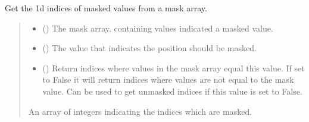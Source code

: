 \documentclass[letterpaper,10pt,english]{sphinxmanual}
\begin{document}
\begin{fulllineitems}
\label{\detokenize{misc:glomar_gridding.mask.get_mask_idx}}
\pysigstartsignatures
\pysiglinewithargsret
{}
{\sphinxparamcomma {}\sphinxparamcomma {}}
{}
\pysigstopsignatures
\sphinxAtStartPar
Get the 1d indices of masked values from a mask array.
\begin{quote}\begin{description}
\begin{itemize}
\item {}
\sphinxAtStartPar
{} () \textendash{} The mask array, containing values indicated a masked value.

\item {}
\sphinxAtStartPar
{} () \textendash{} The value that indicates the position should be masked.

\item {}
\sphinxAtStartPar
{} () \textendash{} Return indices where values in the mask array equal this value. If set
to False it will return indices where values are not equal to the mask
value. Can be used to get unmasked indices if this value is set to
False.

\end{itemize}

\sphinxAtStartPar
An array of integers indicating the indices which are masked.

\end{description}\end{quote}

\end{fulllineitems}

\end{document}
